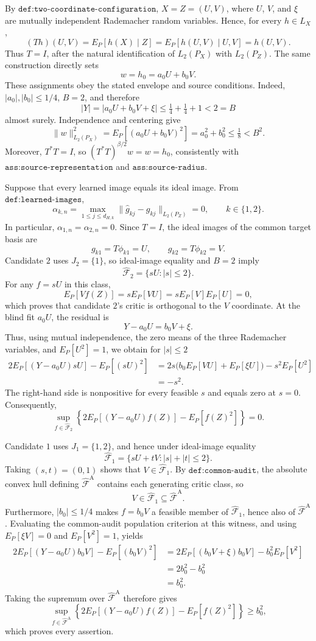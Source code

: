 By \(\texttt{def:two-coordinate-configuration}\), \(X=Z=(U,V)\), where \(U\), \(V\), and \(\xi\) are mutually independent Rademacher random variables. Hence, for every \(h\in L_X\),
\[
 (Th)(U,V)=E_P[h(X)\mid Z]=E_P[h(U,V)\mid U,V]=h(U,V).
\]
Thus \(T=I\), after the natural identification of \(L_2(P_X)\) with \(L_2(P_Z)\). The same construction directly sets
\[
 w=h_0=a_0U+b_0V.
\]
These assignments obey the stated envelope and source conditions. Indeed, \(|a_0|,|b_0|\le 1/4\), \(B=2\), and therefore
\[
 |Y|=|a_0U+b_0V+\xi|\le \tfrac14+\tfrac14+1<2=B
\]
almost surely. Independence and centering give
\[
 \|w\|_{L_2(P_X)}^2=E_P[(a_0U+b_0V)^2]=a_0^2+b_0^2\le \tfrac18<B^2.
\]
Moreover, \(T^*T=I\), so \((T^*T)^{\beta/2}w=w=h_0\), consistently with \(\texttt{ass:source-representation}\) and \(\texttt{ass:source-radius}\).

Suppose that every learned image equals its ideal image. From \(\texttt{def:learned-images}\),
\[
 \alpha_{k,n}=\max_{1\le j\le d_{H,k}}\|\widehat g_{kj}-g_{kj}\|_{L_2(P_Z)}=0,
 \qquad k\in\{1,2\}.
\]
In particular, \(\alpha_{1,n}=\alpha_{2,n}=0\). Since \(T=I\), the ideal images of the common target basis are
\[
 g_{k1}=T\phi_{k1}=U,
 \qquad
 g_{k2}=T\phi_{k2}=V.
\]
Candidate \(2\) uses \(J_2=\{1\}\), so ideal-image equality and \(B=2\) imply
\[
 \widehat{\mathcal F}_2=\{sU:|s|\le2\}.
\]
For any \(f=sU\) in this class,
\[
 E_P[Vf(Z)]=sE_P[VU]=sE_P[V]E_P[U]=0,
\]
which proves that candidate \(2\)'s critic is orthogonal to the \(V\) coordinate. At the blind fit \(a_0U\), the residual is
\[
 Y-a_0U=b_0V+\xi.
\]
Thus, using mutual independence, the zero means of the three Rademacher variables, and \(E_P[U^2]=1\), we obtain for \(|s|\le2\)
\[
\begin{aligned}
 2E_P[(Y-a_0U)sU]-E_P[(sU)^2]
 &=2s\bigl(b_0E_P[VU]+E_P[\xi U]\bigr)-s^2E_P[U^2]\\
 &=-s^2.
\end{aligned}
\]
The right-hand side is nonpositive for every feasible \(s\) and equals zero at \(s=0\). Consequently,
\[
 \sup_{f\in\widehat{\mathcal F}_2}
 \left\{2E_P[(Y-a_0U)f(Z)]-E_P[f(Z)^2]\right\}=0.
\]

Candidate \(1\) uses \(J_1=\{1,2\}\), and hence under ideal-image equality
\[
 \widehat{\mathcal F}_1
 =\{sU+tV:|s|+|t|\le2\}.
\]
Taking \((s,t)=(0,1)\) shows that \(V\in\widehat{\mathcal F}_1\). By \(\texttt{def:common-audit}\), the absolute convex hull defining \(\widehat{\mathcal F}^{\mathrm A}\) contains each generating critic class, so
\[
 V\in\widehat{\mathcal F}_1\subseteq\widehat{\mathcal F}^{\mathrm A}.
\]
Furthermore, \(|b_0|\le1/4\) makes \(f=b_0V\) a feasible member of \(\widehat{\mathcal F}_1\), hence also of \(\widehat{\mathcal F}^{\mathrm A}\). Evaluating the common-audit population criterion at this witness, and using \(E_P[\xi V]=0\) and \(E_P[V^2]=1\), yields
\[
\begin{aligned}
 2E_P[(Y-a_0U)b_0V]-E_P[(b_0V)^2]
 &=2E_P[(b_0V+\xi)b_0V]-b_0^2E_P[V^2]\\
 &=2b_0^2-b_0^2\\
 &=b_0^2.
\end{aligned}
\]
Taking the supremum over \(\widehat{\mathcal F}^{\mathrm A}\) therefore gives
\[
 \sup_{f\in\widehat{\mathcal F}^{\mathrm A}}
 \left\{2E_P[(Y-a_0U)f(Z)]-E_P[f(Z)^2]\right\}\ge b_0^2,
\]
which proves every assertion.